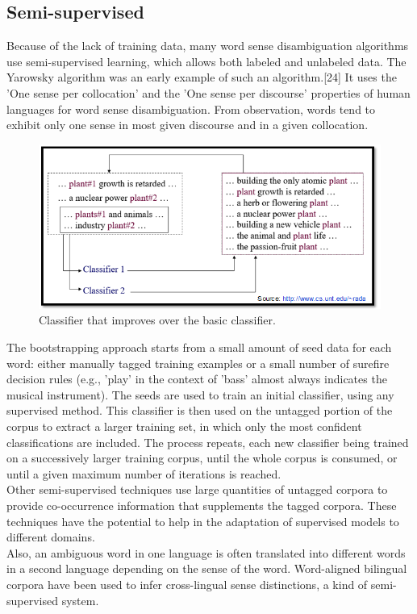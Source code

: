 \subsection*{Semi-supervised}
Because of the lack of training data, many word sense disambiguation algorithms use semi-supervised learning, which allows both labeled and unlabeled data. The Yarowsky algorithm was an early example of such an algorithm.[24] It uses the 'One sense per collocation' and the 'One sense per discourse' properties of human languages for word sense disambiguation. From observation, words tend to exhibit only one sense in most given discourse and in a given collocation.\\
\begin{figure}[tbh]
	\begin{center}
		\includegraphics[width=\columnwidth]{union(semi)}
	\end{center}
	\caption{Classifier that improves over the basic classifier. \label{fig3}}
\end{figure}
The bootstrapping approach starts from a small amount of seed data for each word: either manually tagged training examples or a small number of surefire decision rules (e.g., 'play' in the context of 'bass' almost always indicates the musical instrument). The seeds are used to train an initial classifier, using any supervised method. This classifier is then used on the untagged portion of the corpus to extract a larger training set, in which only the most confident classifications are included. The process repeats, each new classifier being trained on a successively larger training corpus, until the whole corpus is consumed, or until a given maximum number of iterations is reached.\\
Other semi-supervised techniques use large quantities of untagged corpora to provide co-occurrence information that supplements the tagged corpora. These techniques have the potential to help in the adaptation of supervised models to different domains.\\
Also, an ambiguous word in one language is often translated into different words in a second language depending on the sense of the word. Word-aligned bilingual corpora have been used to infer cross-lingual sense distinctions, a kind of semi-supervised system.
